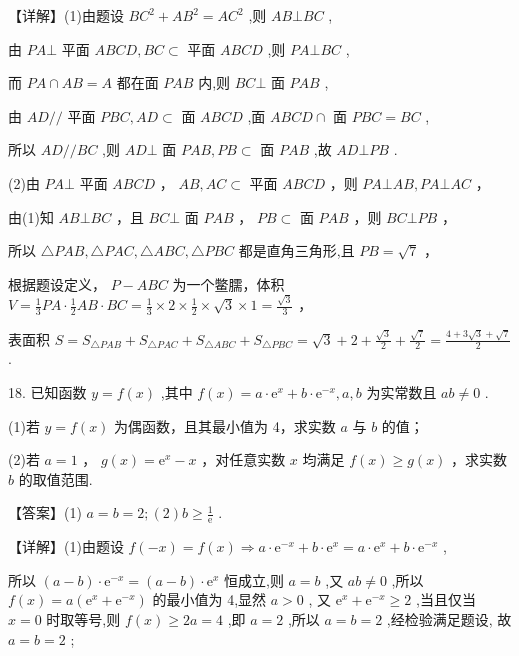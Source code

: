 \documentclass[10pt]{article}
\begin{document}
【详解】(1)由题设 \(B{C}^{2} + A{B}^{2} = A{C}^{2}\) ,则 \({AB} \bot  {BC}\) ,

由 \({PA} \bot\) 平面 \({ABCD},{BC} \subset\) 平面 \({ABCD}\) ,则 \({PA} \bot  {BC}\) ,

而 \({PA} \cap  {AB} = A\) 都在面 \({PAB}\) 内,则 \({BC} \bot\) 面 \({PAB}\) ,

由 \({AD}//\) 平面 \({PBC},{AD} \subset\) 面 \({ABCD}\) ,面 \({ABCD} \cap\) 面 \({PBC} = {BC}\) ,

所以 \({AD}//{BC}\) ,则 \({AD} \bot\) 面 \({PAB},{PB} \subset\) 面 \({PAB}\) ,故 \({AD} \bot  {PB}\) .

(2)由 \({PA} \bot\) 平面 \({ABCD}\) ， \({AB},{AC} \subset\) 平面 \({ABCD}\) ，则 \({PA} \bot  {AB},{PA} \bot  {AC}\) ，

由(1)知 \({AB} \bot  {BC}\) ，且 \({BC} \bot\) 面 \({PAB}\) ， \({PB} \subset\) 面 \({PAB}\) ，则 \({BC} \bot  {PB}\) ，

所以 \(\bigtriangleup  {PAB}, \bigtriangleup  {PAC}, \bigtriangleup  {ABC}, \bigtriangleup  {PBC}\) 都是直角三角形,且 \({PB} = \sqrt{7}\) ，

根据题设定义， \(P - {ABC}\) 为一个鳖臑，体积 \(V = \frac{1}{3}{PA} \cdot  \frac{1}{2}{AB} \cdot  {BC} = \frac{1}{3} \times  2 \times  \frac{1}{2} \times  \sqrt{3} \times  1 = \frac{\sqrt{3}}{3}\) ，

表面积 \(S = {S}_{\bigtriangleup {PAB}} + {S}_{\bigtriangleup {PAC}} + {S}_{\bigtriangleup {ABC}} + {S}_{\bigtriangleup {PBC}} = \sqrt{3} + 2 + \frac{\sqrt{3}}{2} + \frac{\sqrt{7}}{2} = \frac{4 + 3\sqrt{3} + \sqrt{7}}{2}\) .

18. 已知函数 \(y = f\left( x\right)\) ,其中 \(f\left( x\right)  = a \cdot  {\mathrm{e}}^{x} + b \cdot  {\mathrm{e}}^{-x},a,b\) 为实常数且 \({ab} \neq  0\) .

(1)若 \(y = f\left( x\right)\) 为偶函数，且其最小值为 4，求实数 \(a\) 与 \(b\) 的值；

(2)若 \(a = 1\) ， \(g\left( x\right)  = {\mathrm{e}}^{x} - x\) ，对任意实数 \(x\) 均满足 \(f\left( x\right)  \geq  g\left( x\right)\) ，求实数 \(b\) 的取值范围.

【答案】(1) \(a = b = 2;\left( 2\right) b \geq  \frac{1}{\mathrm{e}}\) .

【详解】(1)由题设 \(f\left( {-x}\right)  = f\left( x\right)  \Rightarrow  a \cdot  {\mathrm{e}}^{-x} + b \cdot  {\mathrm{e}}^{x} = a \cdot  {\mathrm{e}}^{x} + b \cdot  {\mathrm{e}}^{-x}\) ,

所以 \(\left( {a - b}\right)  \cdot  {\mathrm{e}}^{-x} = \left( {a - b}\right)  \cdot  {\mathrm{e}}^{x}\) 恒成立,则 \(a = b\) ,又 \({ab} \neq  0\) ,所以 \(f\left( x\right)  = a\left( {{\mathrm{e}}^{x} + {\mathrm{e}}^{-x}}\right)\) 的最小值为 4,显然 \(a > 0\) , 又 \({\mathrm{e}}^{x} + {\mathrm{e}}^{-x} \geq  2\) ,当且仅当 \(x = 0\) 时取等号,则 \(f\left( x\right)  \geq  {2a} = 4\) ,即 \(a = 2\) ,所以 \(a = b = 2\) ,经检验满足题设, 故 \(a = b = 2\) ;
\end{document}
